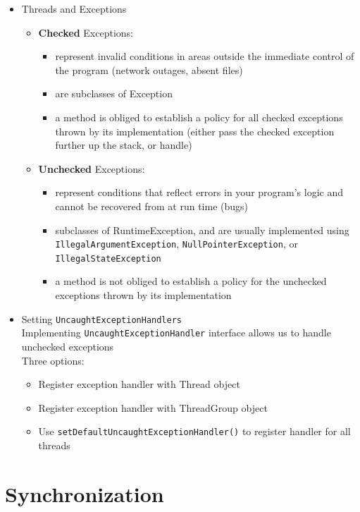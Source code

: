 \documentclass[a4paper]{article}
\newcommand{\inline}[1]{\lstinline!#1!}%
\begin{document}
\begin{itemize}
\begin{itemize}
 			\end{itemize}
 		\item Threads and Exceptions
 			\begin{itemize}
 				\item \textbf{Checked} Exceptions:
 					\begin{itemize}
 						\item represent invalid conditions in areas outside the immediate control of the program (network outages, absent files)
 						\item are subclasses of Exception
 						\item a method is obliged to establish a policy for all checked exceptions thrown by its implementation (either pass the checked exception further up the stack, or handle)
 					\end{itemize}
 				\item \textbf{Unchecked} Exceptions:
 					\begin{itemize}
 						\item represent conditions that reflect errors in your program’s logic and cannot be recovered from at run time (bugs)
 						\item subclasses of RuntimeException, and are usually implemented using \inline{IllegalArgumentException}, \inline{NullPointerException}, or \inline{IllegalStateException}
 						\item a method is not obliged to establish a policy for the unchecked exceptions thrown by its implementation
 					\end{itemize}
 			\end{itemize}
 		\item Setting \inline{UncaughtExceptionHandlers}\\
 			Implementing \inline{UncaughtExceptionHandler} interface allows us to handle unchecked exceptions\\ Three options:
 			\begin{itemize}
 				\item Register exception handler with Thread object
 				\item Register exception handler with ThreadGroup object
 				\item Use \inline{setDefaultUncaughtExceptionHandler()} to register handler for all threads

 			\end{itemize}
	\end{itemize}
\section{Synchronization}
\end{document}
